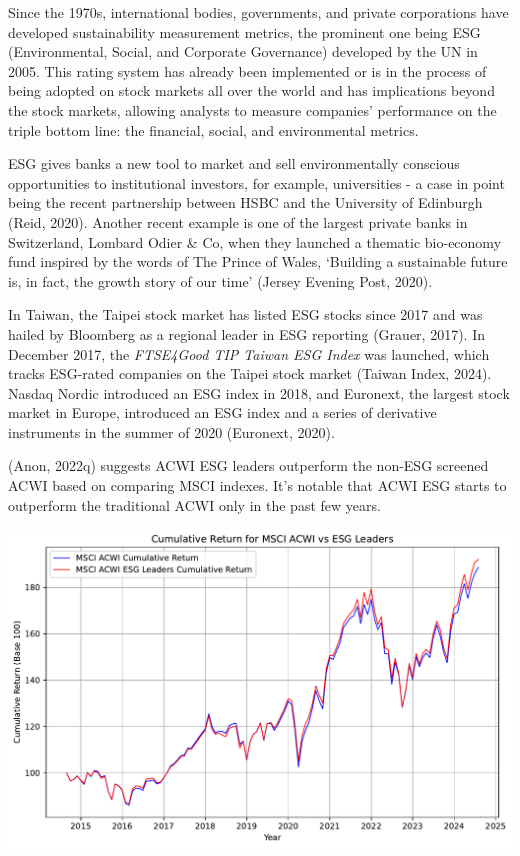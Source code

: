 \documentclass[
  letterpaper,
  DIV=11,
  numbers=noendperiod]{scrartcl}
\begin{document}
Since the 1970s, international bodies, governments, and private
corporations have developed sustainability measurement metrics, the
prominent one being ESG (Environmental, Social, and Corporate
Governance) developed by the UN in 2005. This rating system has already
been implemented or is in the process of being adopted on stock markets
all over the world and has implications beyond the stock markets,
allowing analysts to measure companies' performance on the triple bottom
line: the financial, social, and environmental metrics.

ESG gives banks a new tool to market and sell environmentally conscious
opportunities to institutional investors, for example, universities - a
case in point being the recent partnership between HSBC and the
University of Edinburgh (Reid, 2020). Another recent example is one of
the largest private banks in Switzerland, Lombard Odier \& Co, when they
launched a thematic bio-economy fund inspired by the words of The Prince
of Wales, `Building a sustainable future is, in fact, the growth story
of our time' (Jersey Evening Post, 2020).

In Taiwan, the Taipei stock market has listed ESG stocks since 2017 and
was hailed by Bloomberg as a regional leader in ESG reporting (Grauer,
2017). In December 2017, the \emph{FTSE4Good TIP Taiwan ESG Index} was
launched, which tracks ESG-rated companies on the Taipei stock market
(Taiwan Index, 2024). Nasdaq Nordic introduced an ESG index in 2018, and
Euronext, the largest stock market in Europe, introduced an ESG index
and a series of derivative instruments in the summer of 2020 (Euronext,
2020).

(Anon, 2022q) suggests ACWI ESG leaders outperform the non-ESG screened
ACWI based on comparing MSCI indexes. It's notable that ACWI ESG starts
to outperform the traditional ACWI only in the past few years.

\includegraphics{_thesis_files/figure-pdf/cell-49-output-1.pdf}
\end{document}

